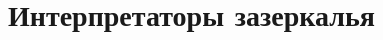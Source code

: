 \documentclass[12pt]{article}
\begin{document}














    \cite{reynolds1972definitional, reynolds1998definitional, defunctionalization-slides}







    \section{Интерпретаторы зазеркалья} \label{sec:wonder-interpreters}







\end{document}
